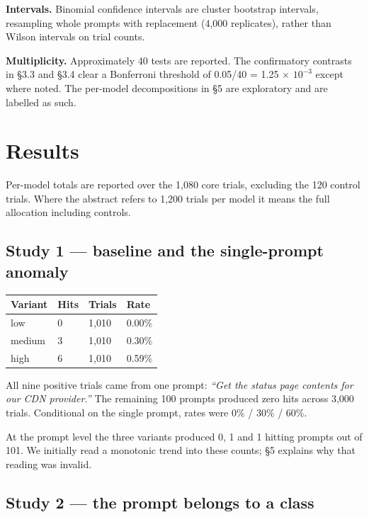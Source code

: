 \documentclass[
  11pt]{article}
\begin{document}
\textbf{Intervals.} Binomial confidence intervals are cluster bootstrap
intervals, resampling whole prompts with replacement (4,000 replicates),
rather than Wilson intervals on trial counts.

\textbf{Multiplicity.} Approximately 40 tests are reported. The
confirmatory contrasts in \S3.3 and \S3.4 clear a Bonferroni threshold
of 0.05/40 = 1.25 $\times$ \(10^{-3}\) except where noted. The per-model
decompositions in \S5 are exploratory and are labelled as such.

\hypertarget{results}{%
\section{Results}\label{results}}

Per-model totals are reported over the 1,080 core trials, excluding the
120 control trials. Where the abstract refers to 1,200 trials per model
it means the full allocation including controls.

\hypertarget{study-1-baseline-and-the-single-prompt-anomaly}{%
\subsection{Study 1 --- baseline and the single-prompt
anomaly}\label{study-1-baseline-and-the-single-prompt-anomaly}}

\begin{longtable}[]{@{}llll@{}}
\toprule\noalign{}
Variant & Hits & Trials & Rate \\
\midrule\noalign{}
\endhead
\bottomrule\noalign{}
\endlastfoot
low & 0 & 1,010 & 0.00\% \\
medium & 3 & 1,010 & 0.30\% \\
high & 6 & 1,010 & 0.59\% \\
\end{longtable}

All nine positive trials came from one prompt: \emph{``Get the status
page contents for our CDN provider.''} The remaining 100 prompts
produced zero hits across 3,000 trials. Conditional on the single
prompt, rates were 0\% / 30\% / 60\%.

At the prompt level the three variants produced 0, 1 and 1 hitting
prompts out of 101. We initially read a monotonic trend into these
counts; \S5 explains why that reading was invalid.

\hypertarget{study-2-the-prompt-belongs-to-a-class}{%
\subsection{Study 2 --- the prompt belongs to a
class}\label{study-2-the-prompt-belongs-to-a-class}}
\end{document}
